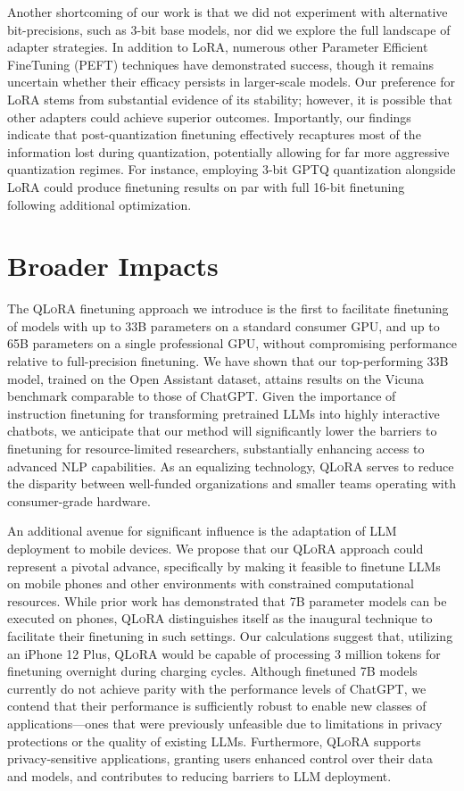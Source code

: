 Another shortcoming of our work is that we did not experiment with alternative bit-precisions, such as 3-bit base models, nor did we explore the full landscape of adapter strategies. In addition to LoRA, numerous other Parameter Efficient FineTuning (PEFT) techniques have demonstrated success, though it remains uncertain whether their efficacy persists in larger-scale models. Our preference for LoRA stems from substantial evidence of its stability; however, it is possible that other adapters could achieve superior outcomes. Importantly, our findings indicate that post-quantization finetuning effectively recaptures most of the information lost during quantization, potentially allowing for far more aggressive quantization regimes. For instance, employing 3-bit GPTQ quantization alongside LoRA could produce finetuning results on par with full 16-bit finetuning following additional optimization.

\section{Broader Impacts}

The \textsc{QLoRA} finetuning approach we introduce is the first to facilitate finetuning of models with up to 33B parameters on a standard consumer GPU, and up to 65B parameters on a single professional GPU, without compromising performance relative to full-precision finetuning. We have shown that our top-performing 33B model, trained on the Open Assistant dataset, attains results on the Vicuna benchmark comparable to those of ChatGPT. Given the importance of instruction finetuning for transforming pretrained LLMs into highly interactive chatbots, we anticipate that our method will significantly lower the barriers to finetuning for resource-limited researchers, substantially enhancing access to advanced NLP capabilities. As an equalizing technology, \textsc{QLoRA} serves to reduce the disparity between well-funded organizations and smaller teams operating with consumer-grade hardware.

An additional avenue for significant influence is the adaptation of LLM deployment to mobile devices. We propose that our \textsc{QLoRA} approach could represent a pivotal advance, specifically by making it feasible to finetune LLMs on mobile phones and other environments with constrained computational resources. While prior work has demonstrated that 7B parameter models can be executed on phones, \textsc{QLoRA} distinguishes itself as the inaugural technique to facilitate their finetuning in such settings. Our calculations suggest that, utilizing an iPhone 12 Plus, \textsc{QLoRA} would be capable of processing 3 million tokens for finetuning overnight during charging cycles. Although finetuned 7B models currently do not achieve parity with the performance levels of ChatGPT, we contend that their performance is sufficiently robust to enable new classes of applications—ones that were previously unfeasible due to limitations in privacy protections or the quality of existing LLMs. Furthermore, \textsc{QLoRA} supports privacy-sensitive applications, granting users enhanced control over their data and models, and contributes to reducing barriers to LLM deployment.

